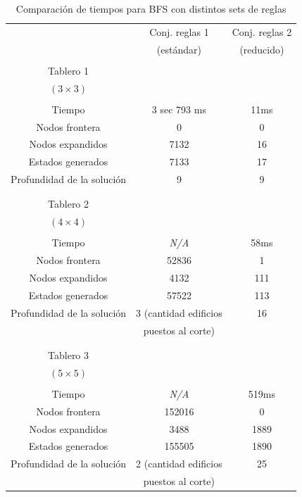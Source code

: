 \documentclass[%
    final,
    reprint,
    notitlepage,
    narroweqnarray,
    inline,
    twoside,
    invited
    ]{ieee}
\begin{document}
\begin{table}[H]
\begin{center}
\begin{tabular}{|c|c|c|}
\hline
 & Conj. reglas 1 &  Conj. reglas 2\\
 & (estándar) &  (reducido)\\

\hline
\hline

&&\\
Tablero 1 & & \\
$(3\times 3)$ & & \\
&&\\
\hline
Tiempo & 3 sec 793 ms & 11ms \\
\hline
Nodos frontera & 0 & 0 \\
\hline
Nodos expandidos & 7132 & 16 \\
\hline
Estados generados & 7133  & 17 \\
\hline
Profundidad de la solución & 9 & 9 \\
\hline
&&\\

\hline
\hline

&&\\
Tablero 2 & & \\
$(4\times 4)$ & & \\
&&\\
\hline
Tiempo & \textit{N/A} & 58ms \\
\hline
Nodos frontera & 52836 & 1 \\
\hline
Nodos expandidos & 4132 & 111 \\
\hline
Estados generados & 57522 & 113 \\
\hline
Profundidad de la solución & 3 (cantidad edificios  & 16 \\
&puestos al corte)&\\
\hline
&&\\

\hline
\hline

&&\\
Tablero 3 & & \\
$(5\times 5)$ & & \\
&&\\
\hline
Tiempo & \textit{N/A} & 519ms \\
\hline
Nodos frontera & 152016 & 0 \\
\hline
Nodos expandidos & 3488 & 1889 \\
\hline
Estados generados & 155505 & 1890 \\
\hline
Profundidad de la solución & 2 (cantidad edificios  & 25 \\
&puestos al corte)&\\

\hline  
\end{tabular}
\end{center}
\caption{Comparación de tiempos para BFS con distintos sets de reglas}\
\end{table}
\end{document}
